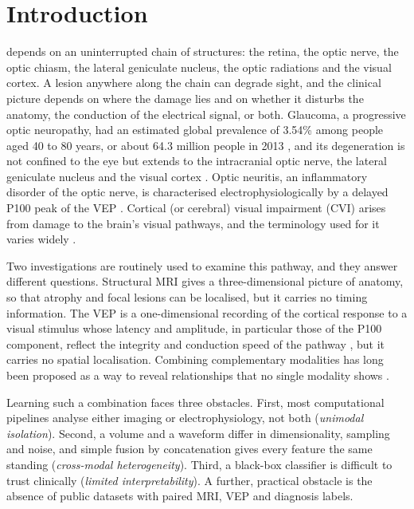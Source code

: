 \documentclass{ieeeaccessapprox}
\begin{document}
\section{Introduction}
 depends on an uninterrupted chain of structures: the retina, the optic nerve, the optic chiasm, the lateral geniculate nucleus, the optic radiations and the visual cortex. A lesion anywhere along the chain can degrade sight, and the clinical picture depends on where the damage lies and on whether it disturbs the anatomy, the conduction of the electrical signal, or both. Glaucoma, a progressive optic neuropathy, had an estimated global prevalence of 3.54\% among people aged 40 to 80 years, or about 64.3 million people in 2013 \cite{tham2014}, and its degeneration is not confined to the eye but extends to the intracranial optic nerve, the lateral geniculate nucleus and the visual cortex \cite{gupta2006}. Optic neuritis, an inflammatory disorder of the optic nerve, is characterised electrophysiologically by a delayed P100 peak of the VEP \cite{halliday1972}. Cortical (or cerebral) visual impairment (CVI) arises from damage to the brain's visual pathways, and the terminology used for it varies widely \cite{sakki2018}.

Two investigations are routinely used to examine this pathway, and they answer different questions. Structural MRI gives a three-dimensional picture of anatomy, so that atrophy and focal lesions can be localised, but it carries no timing information. The VEP is a one-dimensional recording of the cortical response to a visual stimulus whose latency and amplitude, in particular those of the P100 component, reflect the integrity and conduction speed of the pathway \cite{odom2016}, but it carries no spatial localisation. Combining complementary modalities has long been proposed as a way to reveal relationships that no single modality shows \cite{calhoun2016}.

Learning such a combination faces three obstacles. First, most computational pipelines analyse either imaging or electrophysiology, not both (\emph{unimodal isolation}). Second, a volume and a waveform differ in dimensionality, sampling and noise, and simple fusion by concatenation gives every feature the same standing (\emph{cross-modal heterogeneity}). Third, a black-box classifier is difficult to trust clinically (\emph{limited interpretability}). A further, practical obstacle is the absence of public datasets with paired MRI, VEP and diagnosis labels.
\end{document}
